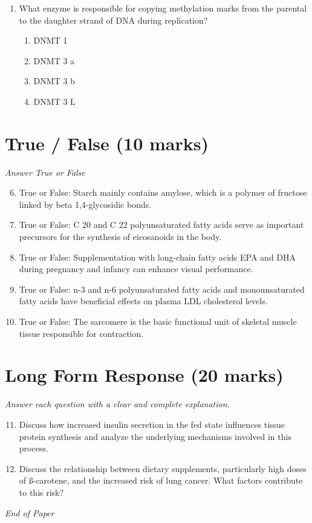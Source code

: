 \documentclass[12pt]{article}
\begin{document}
\begin{enumerate}[label=\arabic*.]
\begin{enumerate}[label=(\alph*)]
    \item Obesity, excess energy intake, normal growth and hypoinsulinaemia
    \item Obesity, abnormal growth, hypothyroidism, hyperinsulinaemia
    \item Underweight, abnormal growth, hypothyroidism, hyperinsulinaemia
\end{enumerate}
\item What enzyme is responsible for copying methylation marks from the parental to the daughter strand of DNA during replication?
\begin{enumerate}[label=(\alph*)]
    \item DNMT 1
    \item DNMT 3 a
    \item DNMT 3 b
    \item DNMT 3 L
\end{enumerate}
\end{enumerate}

\section*{True / False (10 marks)}
\textit{Answer True or False}
\begin{enumerate}[label=\arabic*.]
\setcounter{enumi}{5}
\item True or False: Starch mainly contains amylose, which is a polymer of fructose linked by beta 1,4-glycosidic bonds.
\item True or False: C 20 and C 22 polyunsaturated fatty acids serve as important precursors for the synthesis of eicosanoids in the body.
\item True or False: Supplementation with long-chain fatty acids EPA and DHA during pregnancy and infancy can enhance visual performance.
\item True or False: n-3 and n-6 polyunsaturated fatty acids and monounsaturated fatty acids have beneficial effects on plasma LDL cholesterol levels.
\item True or False: The sarcomere is the basic functional unit of skeletal muscle tissue responsible for contraction.
\end{enumerate}

\section*{Long Form Response (20 marks)}
\textit{Answer each question with a clear and complete explanation.}
\begin{enumerate}[label=\arabic*.]
\setcounter{enumi}{10}
\item Discuss how increased insulin secretion in the fed state influences tissue protein synthesis and analyze the underlying mechanisms involved in this process.
\item Discuss the relationship between dietary supplements, particularly high doses of ß-carotene, and the increased risk of lung cancer. What factors contribute to this risk?
\end{enumerate}

\vfill
\noindent\textit{End of Paper}
\end{document}
